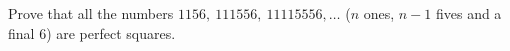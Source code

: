 Prove that all the numbers $1156,\ 111556,\ 11115556,\dots$ ($n$ ones, $n-1$ fives and a final $6$) are perfect squares.
